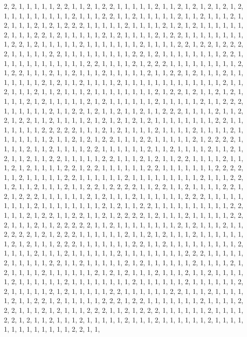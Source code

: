 \documentclass[
]{article}
\begin{document}
\begin{Schunk}
\begin{Soutput}
2, 2, 1, 1, 1, 1, 1, 2, 2, 1, 1, 2, 1, 2, 2, 1, 1, 1, 1, 1, 2, 1, 1, 2, 1, 2, 1, 2, 1, 2, 1, 2, 1, 1, 1, 1, 1, 1, 1, 1, 1, 2, 1, 1, 1, 2, 2, 1, 1, 2, 1, 1, 1, 1, 1, 2, 1, 1, 2, 1, 1, 1, 2, 1, 2, 1, 1, 1, 2, 1, 2, 1, 2, 2, 2, 1, 1, 1, 1, 1, 2, 1, 1, 1, 1, 2, 1, 2, 1, 2, 1, 1, 1, 1, 1, 1, 2, 1, 1, 1, 2, 2, 1, 2, 1, 1, 1, 1, 1, 2, 1, 2, 1, 1, 1, 1, 2, 1, 2, 2, 1, 1, 1, 1, 1, 1, 1, 1, 1, 2, 2, 1, 2, 1, 1, 1, 1, 1, 2, 1, 1, 1, 1, 1, 1, 1, 2, 1, 1, 1, 1, 2, 2, 1, 2, 2, 1, 2, 2, 2, 2, 1, 1, 1, 1, 1, 2, 2, 1, 1, 1, 1, 1, 1, 1, 1, 1, 2, 2, 1, 2, 1, 1, 1, 1, 1, 1, 1, 1, 2, 2, 1, 1, 1, 1, 1, 1, 1, 1, 1, 1, 1, 1, 2, 2, 1, 1, 1, 1, 2, 1, 2, 2, 2, 1, 1, 1, 1, 1, 1, 1, 1, 1, 2, 1, 2, 2, 1, 1, 1, 2, 1, 1, 2, 1, 1, 1, 2, 1, 1, 1, 1, 1, 2, 1, 1, 2, 2, 1, 2, 1, 1, 1, 2, 1, 1, 1, 1, 1, 1, 1, 2, 1, 2, 1, 1, 2, 1, 1, 1, 1, 2, 1, 1, 1, 1, 1, 1, 1, 1, 1, 1, 1, 1, 1, 2, 1, 1, 2, 1, 1, 1, 2, 1, 1, 2, 1, 1, 1, 2, 1, 1, 1, 1, 1, 1, 1, 1, 2, 1, 2, 2, 1, 2, 1, 1, 2, 1, 2, 1, 1, 1, 1, 2, 1, 2, 1, 1, 1, 1, 1, 2, 1, 2, 1, 1, 1, 1, 1, 1, 2, 1, 1, 1, 1, 1, 2, 1, 1, 2, 2, 2, 1, 1, 1, 1, 1, 1, 2, 1, 1, 2, 2, 1, 2, 1, 1, 2, 1, 1, 2, 1, 1, 2, 2, 2, 1, 1, 1, 1, 2, 1, 1, 2, 2, 1, 2, 2, 1, 1, 2, 1, 1, 1, 1, 2, 1, 2, 1, 2, 1, 2, 1, 2, 1, 1, 1, 1, 1, 1, 1, 1, 2, 2, 1, 1, 1, 1, 1, 1, 1, 2, 2, 2, 2, 2, 1, 1, 1, 2, 1, 2, 1, 1, 1, 1, 2, 1, 1, 1, 1, 2, 1, 1, 1, 1, 2, 1, 1, 1, 1, 1, 1, 1, 2, 1, 1, 2, 1, 2, 1, 2, 2, 1, 1, 1, 2, 2, 1, 1, 1, 1, 1, 2, 1, 2, 2, 2, 2, 1, 1, 1, 1, 2, 1, 1, 2, 1, 1, 1, 1, 2, 2, 1, 1, 1, 1, 1, 1, 2, 1, 1, 2, 1, 1, 1, 1, 2, 1, 1, 2, 1, 2, 1, 1, 2, 1, 1, 2, 2, 1, 1, 1, 1, 1, 2, 2, 1, 1, 1, 2, 1, 2, 1, 1, 2, 2, 1, 1, 1, 1, 2, 1, 1, 1, 2, 1, 2, 1, 1, 1, 1, 2, 2, 1, 2, 2, 1, 1, 1, 1, 1, 1, 2, 2, 1, 1, 1, 1, 1, 1, 1, 2, 2, 2, 2, 1, 1, 2, 1, 1, 1, 1, 1, 2, 2, 1, 1, 1, 1, 1, 1, 2, 1, 1, 1, 1, 1, 1, 1, 1, 1, 2, 1, 1, 1, 2, 2, 1, 2, 1, 1, 2, 1, 1, 1, 2, 1, 1, 2, 2, 1, 2, 2, 2, 2, 1, 1, 2, 2, 1, 1, 2, 1, 1, 1, 1, 2, 2, 1, 2, 1, 2, 2, 2, 1, 1, 1, 1, 1, 1, 2, 1, 2, 1, 1, 1, 2, 1, 1, 1, 1, 1, 1, 2, 2, 2, 1, 1, 1, 1, 1, 1, 1, 1, 1, 2, 1, 1, 1, 1, 1, 1, 1, 1, 2, 1, 2, 1, 1, 2, 2, 1, 1, 1, 1, 1, 1, 1, 1, 1, 1, 2, 2, 1, 1, 1, 2, 1, 2, 2, 1, 1, 2, 2, 1, 1, 2, 1, 2, 2, 2, 2, 1, 2, 1, 1, 1, 2, 1, 1, 1, 1, 1, 2, 2, 2, 1, 1, 1, 2, 1, 1, 2, 2, 2, 2, 2, 1, 1, 2, 1, 1, 1, 1, 1, 1, 1, 1, 2, 1, 2, 1, 1, 1, 2, 1, 1, 2, 2, 2, 2, 1, 2, 1, 2, 2, 2, 1, 1, 1, 1, 1, 1, 2, 1, 1, 2, 1, 2, 1, 1, 1, 2, 1, 1, 1, 1, 1, 1, 1, 2, 1, 2, 1, 1, 1, 2, 2, 2, 1, 1, 1, 1, 1, 1, 1, 2, 2, 1, 1, 2, 1, 1, 1, 1, 1, 1, 1, 1, 1, 2, 1, 1, 1, 1, 2, 1, 1, 1, 2, 1, 1, 1, 1, 1, 1, 2, 1, 1, 1, 1, 1, 1, 1, 1, 2, 2, 2, 1, 1, 1, 1, 1, 2, 1, 1, 1, 1, 1, 2, 2, 1, 1, 2, 1, 1, 1, 1, 1, 2, 1, 2, 1, 1, 1, 1, 1, 1, 2, 1, 1, 1, 1, 2, 1, 2, 1, 1, 1, 1, 2, 1, 1, 1, 1, 1, 1, 2, 1, 2, 1, 2, 1, 1, 1, 2, 1, 1, 1, 2, 1, 1, 2, 1, 1, 1, 1, 1, 2, 1, 1, 1, 1, 1, 1, 2, 1, 1, 1, 1, 1, 1, 1, 1, 2, 1, 1, 1, 1, 1, 1, 2, 1, 1, 1, 1, 1, 1, 2, 2, 1, 1, 1, 1, 1, 2, 1, 2, 1, 1, 1, 1, 1, 2, 2, 1, 1, 1, 1, 1, 1, 2, 2, 1, 1, 1, 2, 1, 1, 1, 1, 1, 2, 1, 1, 2, 2, 1, 2, 1, 1, 1, 1, 1, 2, 2, 2, 1, 2, 2, 1, 1, 1, 1, 1, 1, 1, 2, 1, 1, 1, 1, 2, 2, 2, 1, 1, 1, 2, 1, 2, 1, 1, 1, 2, 2, 2, 1, 1, 2, 1, 2, 2, 2, 1, 1, 1, 1, 1, 1, 2, 1, 1, 1, 1, 2, 2, 1, 2, 1, 1, 2, 1, 1, 1, 2, 1, 1, 1, 1, 1, 2, 1, 1, 1, 2, 1, 1, 1, 1, 1, 1, 2, 1, 1, 1, 1, 1, 1, 1, 1, 1, 1, 1, 1, 1, 2, 2, 1, 1, 
\end{Soutput}
\end{Schunk}
\end{document}
